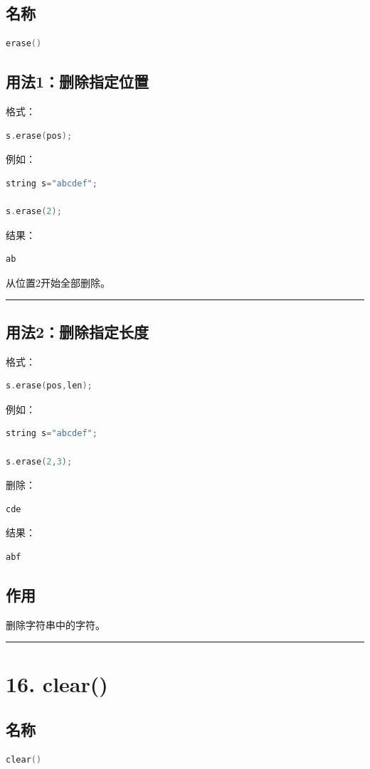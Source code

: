\documentclass[10pt,twocolumn]{extarticle}
\begin{document}
\subsection{名称}
\begin{lstlisting}[language=C++]
erase()
\end{lstlisting}

\subsection{用法1：删除指定位置}
格式：
\begin{lstlisting}[language=C++]
s.erase(pos);
\end{lstlisting}
例如：
\begin{lstlisting}[language=C++]
string s="abcdef";

s.erase(2);
\end{lstlisting}
结果：
\begin{lstlisting}
ab
\end{lstlisting}
从位置2开始全部删除。

\noindent\rule{\linewidth}{0.4pt}

\subsection{用法2：删除指定长度}
格式：
\begin{lstlisting}[language=C++]
s.erase(pos,len);
\end{lstlisting}
例如：
\begin{lstlisting}[language=C++]
string s="abcdef";

s.erase(2,3);
\end{lstlisting}
删除：
\begin{lstlisting}
cde
\end{lstlisting}
结果：
\begin{lstlisting}
abf
\end{lstlisting}

\subsection{作用}
删除字符串中的字符。

\noindent\rule{\linewidth}{0.4pt}

\section{16. clear()}

\subsection{名称}
\begin{lstlisting}[language=C++]
clear()
\end{lstlisting}
\end{document}
